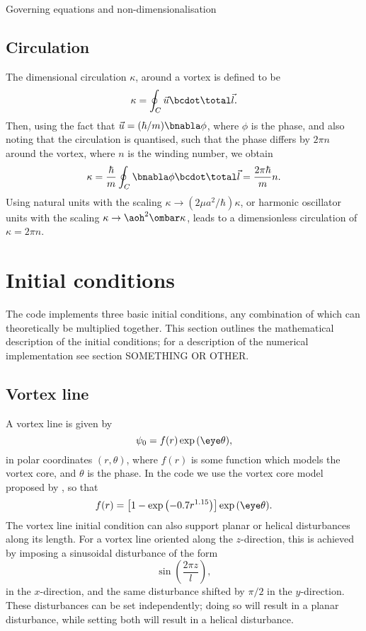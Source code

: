 \begin{chapter}{\label{cha:equations}Governing equations and
  non-dimensionalisation}
  \subsection{Circulation}
  The dimensional circulation $\kappa$, around a vortex is defined to be
  \begin{equation*}
    \kappa = \oint_{C}{\vec{u}\bcdot\total\vec{l}}.
  \end{equation*}
  Then, using the fact that $\vec{u} = (\hbar/m)\bnabla\phi$, where $\phi$ is
  the phase, and also noting that the circulation is quantised, such that the
  phase differs by $2\pi n$ around the vortex, where $n$ is the winding number,
  we obtain
  \begin{equation*}
    \kappa = \frac{\hbar}{m} \oint_{C}{\bnabla\phi\bcdot\total\vec{l}} =
    \frac{2\pi\hbar}{m}n.
  \end{equation*}
  Using natural units with the scaling $\kappa \to (2\mu a^{2}/\hbar)\kappa$,
  or harmonic oscillator units with the scaling $\kappa \to
  \aoh^{2}\ombar\kappa$, leads to a dimensionless circulation of
  $\kappa = 2\pi n$.

  \section{Initial conditions}
  The code implements three basic initial conditions, any combination of which
  can theoretically be multiplied together.  This section outlines the
  mathematical description of the initial conditions; for a description of the
  numerical implementation see section SOMETHING OR OTHER.

  \subsection{Vortex line}
  A vortex line is given by
  \begin{equation*}
    \psi_{0} = f(r) \exp{(\eye \theta)},
  \end{equation*}
  in polar coordinates $(r, \theta)$, where $f(r)$ is some function which
  models the vortex core, and $\theta$ is the phase.  In the code we use the
  vortex core model proposed by \citet{BR01}, so that
  \begin{equation*}
    f(r) = \left[ 1 - \exp{\left( -0.7r^{1.15}\right)} \right] \exp{(\eye
    \theta)}.
  \end{equation*}
  The vortex line initial condition can also support planar or helical
  disturbances along its length.  For a vortex line oriented along the
  $z$-direction, this is achieved by imposing a sinusoidal
  disturbance of the form
  \begin{equation*}
    \sin{\left( \frac{2\pi z}{l} \right)},
  \end{equation*}
  in the $x$-direction, and the same disturbance shifted by $\pi/2$ in the
  $y$-direction.  These disturbances can be set independently; doing so will
  result in a planar disturbance, while setting both will result in a helical
  disturbance.


\end{chapter}

